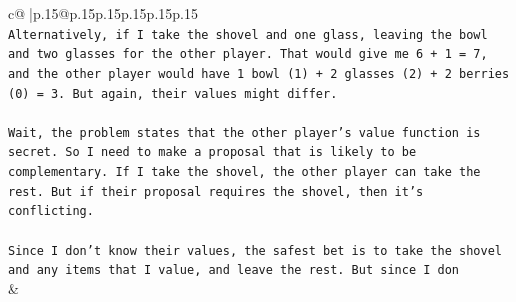 \documentclass{article}
\begin{document}
{\begin{supertabular}{c@{$\;$}|p{.15\linewidth}@{}p{.15\linewidth}p{.15\linewidth}p{.15\linewidth}p{.15\linewidth}p{.15\linewidth}}
{{{\\ 
\texttt{Alternatively, if I take the shovel and one glass, leaving the bowl and two glasses for the other player. That would give me 6 + 1 = 7, and the other player would have 1 bowl (1) + 2 glasses (2) + 2 berries (0) = 3. But again, their values might differ. } \\
\\ 
\texttt{Wait, the problem states that the other player's value function is secret. So I need to make a proposal that is likely to be complementary. If I take the shovel, the other player can take the rest. But if their proposal requires the shovel, then it's conflicting. } \\
\\ 
\texttt{Since I don't know their values, the safest bet is to take the shovel and any items that I value, and leave the rest. But since I don} \\
            }
        }
    }
    & \\ \\


\end{supertabular}}
\end{document}
